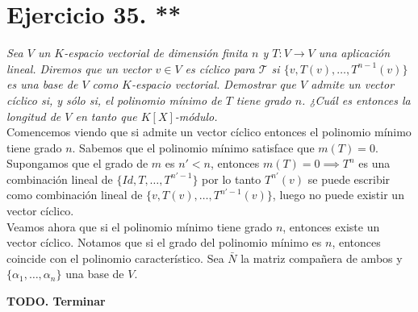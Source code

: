 \section{Ejercicio 35. **} \textit{Sea \(V\) un \(K\)-espacio
  vectorial de dimensión finita \(n\) y \(T:V \to V\) una
  aplicación lineal. Diremos que un vector \(v \in V\) es cíclico para
  \(\mathcal{T}\) si \(\{v, T(v), \dots, T^{n-1}(v)\}\) es una base de \(V\)
  como \(K\)-espacio vectorial. Demostrar que \(V\) admite un vector cíclico si,
  y sólo si, el polinomio mínimo de \(T\) tiene grado \(n\). ¿Cuál es entonces
  la longitud de \(V\) en tanto que \(K[X]\)-módulo.}\\


Comencemos viendo que si admite un vector cíclico entonces el polinomio mínimo
tiene grado \(n\). Sabemos que el polinomio mínimo satisface que \(m(T)=0\). Supongamos que el
grado de \(m\) es \(n' < n\),  entonces \(m(T)=0 \implies T^{n}\) es una
combinación lineal de \(\{Id,T,\dots,T^{n'-1}\}\) por lo tanto \(T^{n'}(v)\) se
puede escribir como combinación lineal de \(\{v,T(v),\dots,T^{n'-1}(v)\}\),
luego no puede existir un vector cíclico.\\

Veamos ahora que si el polinomio mínimo tiene grado \(n\), entonces existe un
vector cíclico. Notamos que si el grado del polinomio mínimo es \(n\), entonces
coincide con el polinomio característico. Sea \(\bar{N}\) la matriz compañera de
ambos y \(\{\alpha_1, \dots, \alpha_n\}\) una base de \(V\).

\textbf{TODO. Terminar}
